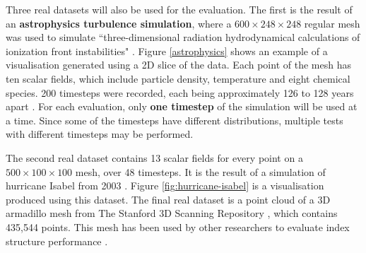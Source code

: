 Three real datasets will also be used for the evaluation. The first is the result of an \textbf{astrophysics turbulence simulation}, where a $600 \times 248 \times 248$ regular mesh was used to simulate ``three-dimensional radiation hydrodynamical calculations of ionization front instabilities" \cite{astrophysics-dataset}. Figure \ref{astrophysics} shows an example of a visualisation generated using a 2D slice of the data. Each point of the mesh has ten scalar fields, which include particle density, temperature and eight chemical species. 200 timesteps were recorded, each being approximately 126 to 128 years apart \cite{astrophysics-dataset}. For each evaluation, only \textbf{one timestep} of the simulation will be used at a time. Since some of the timesteps have different distributions, multiple tests with different timesteps may be performed.

The second real dataset contains 13 scalar fields for every point on a $500 \times 100 \times 100$ mesh, over 48 timesteps. It is the result of a simulation of hurricane Isabel from 2003 \cite{hurricane-isabel-dataset}. Figure \ref{fig:hurricane-isabel} is a visualisation produced using this dataset. The final real dataset is a point cloud of a 3D armadillo mesh from The Stanford 3D Scanning Repository \cite{armadillo-mesh}, which contains 435,544 points. This mesh has been used by other researchers to evaluate index structure performance \cite{kd-tree-gpu, accelerating-kdtree-nn}.


